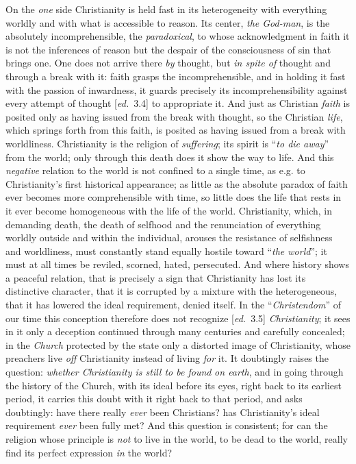 \documentclass[12pt,a4paper,openany]{book}
\newcommand{\kpage}[1]{\marginnote{\footnotesize\textit{[#1]}}}
\newcommand{\ed}[1]{{\small[\textit{ed.}\ #1]}}
\begin{document}
On the \emph{one} side Christianity is held fast in its heterogeneity
with everything worldly and with what is accessible to reason. Its
center, \emph{the God-man}, is the absolutely incomprehensible, the \emph{paradoxical}, to
whose acknowledgment in faith it is not the inferences of reason but the despair
of the consciousness of sin that brings one. One does not arrive there \emph{by} thought,
but \emph{in spite of} thought and through a break with it: faith grasps
the incomprehensible, and in holding it fast with the passion of inwardness,
it guards precisely its incomprehensibility against every
attempt of thought \ed{3.4} to appropriate it. And just as Christian
\emph{faith} is posited only as having issued from the break with thought,
so the Christian \emph{life}, which springs forth from this faith, is posited as
having issued from a break with worldliness. Christianity is the religion of \emph{suffering};
its spirit is ``\emph{to die away}'' from the world; only through this
death does it show the way to life. And this \emph{negative} relation to the world
is not confined to a single time, as e.g. to Christianity's
first historical appearance; as little as the absolute paradox of faith
ever becomes more comprehensible with time, so little does
the life that rests in it ever become homogeneous with the life of the world. Christianity,
which, in demanding death, the death of selfhood and the renunciation
of everything worldly outside and within the individual, arouses the resistance of selfishness
and worldliness, must constantly stand equally
hostile toward ``\emph{the world}''; it must at all times be reviled,
scorned, hated, persecuted. And where history shows a peaceful relation,
that is precisely a sign that Christianity has lost its
distinctive character, that it is corrupted by a mixture
with the heterogeneous, that it has lowered the ideal requirement, denied\kpage{84}
itself. In the ``\emph{Christendom}'' of our time this
conception therefore does not recognize \ed{3.5} \emph{Christianity}; it sees in it only a deception
continued through many centuries and carefully concealed; in the
\emph{Church} protected by the state only a distorted image of Christianity,
whose preachers live \emph{off} Christianity instead of living \emph{for} it.
It doubtingly raises the question: \emph{whether Christianity is still to be found}
\emph{on earth}, and in going through the history of the Church, with its ideal before its eyes,
right back to its earliest period, it carries this doubt with
it right back to that period, and asks doubtingly: have there really \emph{ever} been
Christians? has Christianity's ideal requirement \emph{ever} been fully
met? And this question is consistent; for can the religion
whose principle is \emph{not} to live in the world, to be dead to the world,
really find its perfect expression \emph{in} the world?
\end{document}
